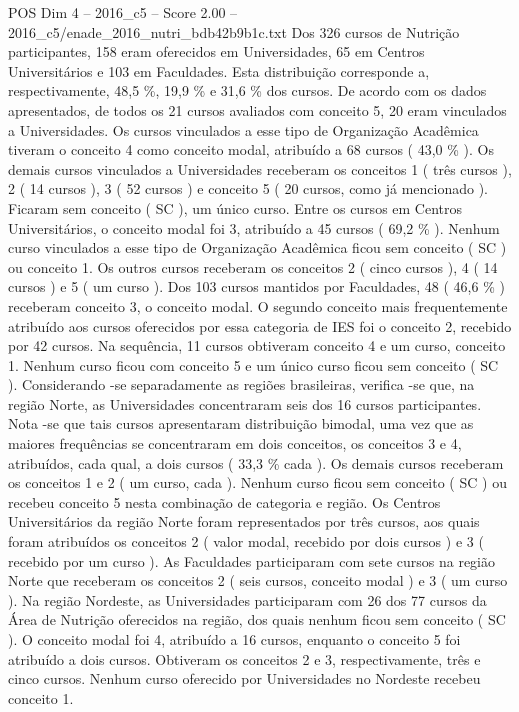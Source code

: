 \begin{textsample}{POS Dim 4 – 2016\_c5 – Score 2.00 – 2016\_c5/enade\_2016\_nutri\_bdb42b9b1c.txt}
Dos 326 cursos de Nutrição participantes, 158 eram oferecidos em Universidades, 65 em Centros Universitários e 103 em Faculdades.
Esta distribuição corresponde a, respectivamente, 48,5 \%, 19,9 \% e 31,6 \% dos cursos.
De acordo com os dados apresentados, de todos os 21 cursos avaliados com conceito 5, 20 eram vinculados a Universidades.
Os cursos vinculados a esse tipo de Organização Acadêmica tiveram o conceito 4 como conceito modal, atribuído a 68 cursos ( 43,0 \% ).
Os demais cursos vinculados a Universidades receberam os conceitos 1 ( três cursos ), 2 ( 14 cursos ), 3 ( 52 cursos ) e conceito 5 ( 20 cursos, como já mencionado ).
Ficaram sem conceito ( SC ), um único curso.
Entre os cursos em Centros Universitários, o conceito modal foi 3, atribuído a 45 cursos ( 69,2 \% ).
Nenhum curso vinculados a esse tipo de Organização Acadêmica ficou sem conceito ( SC ) ou conceito 1.
Os outros cursos receberam os conceitos 2 ( cinco cursos ), 4 ( 14 cursos ) e 5 ( um curso ).
Dos 103 cursos mantidos por Faculdades, 48 ( 46,6 \% ) receberam conceito 3, o conceito modal.
O segundo conceito mais frequentemente atribuído aos cursos oferecidos por essa categoria de IES foi o conceito 2, recebido por 42 cursos.
Na sequência, 11 cursos obtiveram conceito 4 e um curso, conceito 1.
Nenhum curso ficou com conceito 5 e um único curso ficou sem conceito ( SC ).
Considerando -se separadamente as regiões brasileiras, verifica -se que, na região Norte, as Universidades concentraram seis dos 16 cursos participantes.
Nota -se que tais cursos apresentaram distribuição bimodal, uma vez que as maiores frequências se concentraram em dois conceitos, os conceitos 3 e 4, atribuídos, cada qual, a dois cursos ( 33,3 \% cada ).
Os demais cursos receberam os conceitos 1 e 2 ( um curso, cada ).
Nenhum curso ficou sem conceito ( SC ) ou recebeu conceito 5 nesta combinação de categoria e região.
Os Centros Universitários da região Norte foram representados por três cursos, aos quais foram atribuídos os conceitos 2 ( valor modal, recebido por dois cursos ) e 3 ( recebido por um curso ).
As Faculdades participaram com sete cursos na região Norte que receberam os conceitos 2 ( seis cursos, conceito modal ) e 3 ( um curso ).
Na região Nordeste, as Universidades participaram com 26 dos 77 cursos da Área de Nutrição oferecidos na região, dos quais nenhum ficou sem conceito ( SC ).
O conceito modal foi 4, atribuído a 16 cursos, enquanto o conceito 5 foi atribuído a dois cursos.
Obtiveram os conceitos 2 e 3, respectivamente, três e cinco cursos.
Nenhum curso oferecido por Universidades no Nordeste recebeu conceito 1.

\end{textsample}
